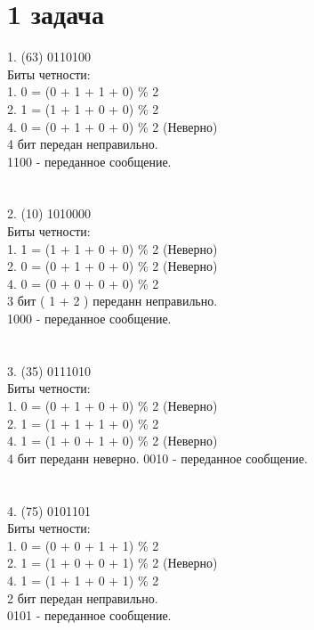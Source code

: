 \documentclass[12pt,onecolumn]{article}
\begin{document}
\section{1 задача}
1. (63)  0110100 \\
   Биты четности:\\
   1. 0 = (0 + 1 + 1 + 0) \% 2 \\
   2. 1 = (1 + 1 + 0 + 0) \% 2\\
   4. 0 = (0 + 1 + 0 + 0) \% 2 (Неверно)  \\
   4 бит передан неправильно. \\
   1100 - переданное сообщение. \\ 
\\
\\
2. (10) 1010000 \\
   Биты четности: \\
   1. 1 = (1 + 1 + 0 + 0) \% 2 (Неверно) \\
   2. 0 = (0 + 1 + 0 + 0) \% 2 (Неверно) \\
   4. 0 = (0 + 0 + 0 + 0) \% 2 \\
   3 бит ( 1 + 2 ) переданн неправильно. \\
   1000 - переданное сообщение. \\
\\
\\
3. (35) 0111010 \\
   Биты четности: \\
   1. 0 = (0 + 1 + 0 + 0) \% 2 (Неверно)\\
   2. 1 = (1 + 1 + 1 + 0) \% 2 \\ 
   4. 1 = (1 + 0 + 1 + 0) \% 2 (Неверно) \\ 
   4 бит переданн неверно.
   0010 - переданное сообщение. \\
\\
\\
4. (75) 0101101 \\
   Биты четности: \\
   1. 0 = (0 + 0 + 1 + 1) \% 2 \\
   2. 1 = (1 + 0 + 0 + 1) \% 2 (Неверно)  \\
   4. 1 = (1 + 1 + 0 + 1) \% 2 \\
   2 бит передан неправильно. \\
   0101 - переданное сообщение. \\
\newpage
\end{document}
